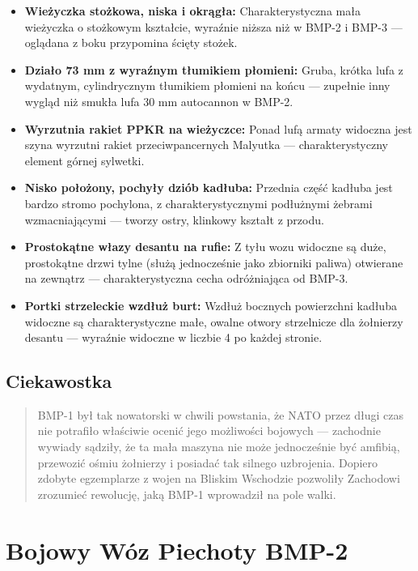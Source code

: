 \documentclass[12pt,openany,oneside]{book}
\providecommand{\tightlist}{%
  \setlength{\itemsep}{0pt}\setlength{\parskip}{0pt}}
\begin{document}
\begin{itemize}
\tightlist
\item
  \textbf{Wieżyczka stożkowa, niska i okrągła:} Charakterystyczna mała
  wieżyczka o stożkowym kształcie, wyraźnie niższa niż w BMP-2 i BMP-3
  --- oglądana z boku przypomina ścięty stożek.
\item
  \textbf{Działo 73 mm z wyraźnym tłumikiem płomieni:} Gruba, krótka
  lufa z wydatnym, cylindrycznym tłumikiem płomieni na końcu ---
  zupełnie inny wygląd niż smukła lufa 30 mm autocannon w BMP-2.
\item
  \textbf{Wyrzutnia rakiet PPKR na wieżyczce:} Ponad lufą armaty
  widoczna jest szyna wyrzutni rakiet przeciwpancernych Malyutka ---
  charakterystyczny element górnej sylwetki.
\item
  \textbf{Nisko położony, pochyły dziób kadłuba:} Przednia część kadłuba
  jest bardzo stromo pochylona, z charakterystycznymi podłużnymi żebrami
  wzmacniającymi --- tworzy ostry, klinkowy kształt z przodu.
\item
  \textbf{Prostokątne włazy desantu na rufie:} Z tyłu wozu widoczne są
  duże, prostokątne drzwi tylne (służą jednocześnie jako zbiorniki
  paliwa) otwierane na zewnątrz --- charakterystyczna cecha odróżniająca
  od BMP-3.
\item
  \textbf{Portki strzeleckie wzdłuż burt:} Wzdłuż bocznych powierzchni
  kadłuba widoczne są charakterystyczne małe, owalne otwory strzelnicze
  dla żołnierzy desantu --- wyraźnie widoczne w liczbie 4 po każdej
  stronie.
\end{itemize}

\section{Ciekawostka}\label{ciekawostka-3}

\begin{quote}
BMP-1 był tak nowatorski w chwili powstania, że NATO przez długi czas
nie potrafiło właściwie ocenić jego możliwości bojowych --- zachodnie
wywiady sądziły, że ta mała maszyna nie może jednocześnie być amfibią,
przewozić ośmiu żołnierzy i posiadać tak silnego uzbrojenia. Dopiero
zdobyte egzemplarze z wojen na Bliskim Wschodzie pozwoliły Zachodowi
zrozumieć rewolucję, jaką BMP-1 wprowadził na pole walki.
\end{quote}

\chapter{Bojowy Wóz Piechoty BMP-2}\label{bojowy-wuxf3z-piechoty-bmp-2}
\end{document}
